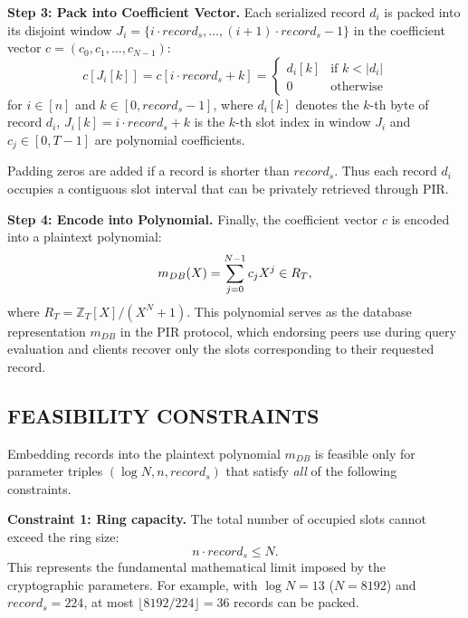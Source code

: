 \documentclass[letterpaper,journal]{IEEEtran}
\begin{document}
\textbf{Step 3: Pack into Coefficient Vector.} 
Each serialized record $d_i$ is packed into its disjoint window $J_i = \{i \cdot record_s, \dots, (i+1) \cdot record_s - 1\}$ 
in the coefficient vector $c = (c_0, c_1, \dots, c_{N-1})$:
\begin{equation}
\label{eq:packing}
c[J_i[k]] = c[i \cdot record_s + k] = 
\begin{cases}
d_i[k] & \text{if } k < |d_i| \\
0 & \text{otherwise}
\end{cases}
\end{equation}
for $i \in [n]$ and $k \in [0, record_s-1]$, where $d_i[k]$ denotes the $k$-th byte of record $d_i$,
$J_i[k] = i \cdot record_s + k$ is the $k$-th slot index in window $J_i$ and
$c_j \in [0,T-1]$ are polynomial coefficients.

Padding zeros are added if a record is shorter than $record_s$. Thus each record $d_i$ occupies a contiguous slot interval that can 
be privately retrieved through PIR.

\textbf{Step 4: Encode into Polynomial.} 
Finally, the coefficient vector $c$ is encoded into a plaintext polynomial:
\begin{equation}
\label{eq:polynomial_db}
\emph{$m_{DB}$}(X) = \sum_{j=0}^{N-1} c_j X^j \in R_T,
\end{equation}
where $R_T = \mathbb{Z}_T[X]/(X^N+1)$. 
This polynomial serves as the database representation \emph{$m_{DB}$} in the PIR protocol, which endorsing peers use during query evaluation and
clients recover only the slots corresponding to their requested record.

\subsection{FEASIBILITY CONSTRAINTS}

Embedding records into the plaintext polynomial \emph{$m_{DB}$} is feasible only for parameter triples 
$(\log N, n, record_s)$ that satisfy \emph{all} of the following constraints. 

\textbf{Constraint 1: Ring capacity.}
The total number of occupied slots cannot exceed the ring size:
\begin{equation}
    \label{eq:ring_capacity}
    n \cdot record_s \leq N.
\end{equation}
This represents the fundamental mathematical limit imposed by the cryptographic parameters. 
For example, with $\log N = 13$ ($N = 8192$) and $record_s = 224$, 
at most $\lfloor 8192/224 \rfloor = 36$ records can be packed.
\end{document}

